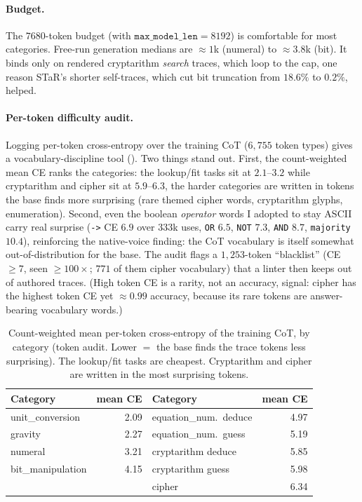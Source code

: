 \documentclass[11pt]{article}
\begin{document}
\paragraph{Budget.} The $7680$-token budget (with $\texttt{max\_model\_len}=8192$) is
comfortable for most categories. Free-run generation medians are $\approx\!1$k (numeral) to
$\approx\!3.8$k (bit). It binds only on rendered cryptarithm \emph{search} traces, which loop
to the cap, one reason STaR's shorter self-traces, which cut bit truncation from $18.6\%$ to
$0.2\%$, helped.

\paragraph{Per-token difficulty audit.} Logging per-token cross-entropy over the training
CoT ($6{,}755$ token types) gives a vocabulary-discipline tool (). Two things
stand out. First, the count-weighted mean CE ranks the categories: the lookup/fit tasks sit
at $2.1$--$3.2$ while cryptarithm and cipher sit at $5.9$--$6.3$, the harder categories are
written in tokens the base finds more surprising (rare themed cipher words, cryptarithm
glyphs, enumeration). Second, even the boolean \emph{operator} words I adopted to stay ASCII
carry real surprise (\texttt{->} CE $6.9$ over $333$k uses, \texttt{OR} $6.5$, \texttt{NOT}
$7.3$, \texttt{AND} $8.7$, \texttt{majority} $10.4$), reinforcing the native-voice finding:
the CoT vocabulary is itself somewhat out-of-distribution for the base. The audit flags a
$1{,}253$-token ``blacklist'' (CE $\geq 7$, seen $\geq 100\times$; $771$ of them cipher
vocabulary) that a linter then keeps out of authored traces. (High token CE is a rarity, not
an accuracy, signal: cipher has the highest token CE yet $\approx\!0.99$ accuracy, because its
rare tokens are answer-bearing vocabulary words.)

\begin{table}[htbp]
\centering
\caption{Count-weighted mean per-token cross-entropy of the training CoT, by category (token
audit. Lower $=$ the base finds the trace tokens less surprising). The lookup/fit tasks are
cheapest. Cryptarithm and cipher are written in the most surprising tokens.}
\label{tab:tokce}
\small
\begin{tabular}{l r | l r}
\toprule
Category & mean CE & Category & mean CE \\
\midrule
unit\_conversion & 2.09 & equation\_num.\ deduce & 4.97 \\
gravity          & 2.27 & equation\_num.\ guess  & 5.19 \\
numeral          & 3.21 & cryptarithm deduce     & 5.85 \\
bit\_manipulation& 4.15 & cryptarithm guess      & 5.98 \\
                 &      & cipher                 & 6.34 \\
\bottomrule
\end{tabular}
\end{table}
\end{document}
